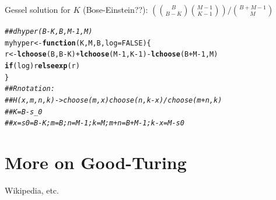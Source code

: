 \documentclass{article}\usepackage[]{graphicx}\usepackage[]{color}
\makeatletter
\newcommand{\hlnum}[1]{\textcolor[rgb]{0.686,0.059,0.569}{#1}}%
\newcommand{\hlcom}[1]{\textcolor[rgb]{0.678,0.584,0.686}{\textit{#1}}}%
\newcommand{\hlopt}[1]{\textcolor[rgb]{0,0,0}{#1}}%
\newcommand{\hlstd}[1]{\textcolor[rgb]{0.345,0.345,0.345}{#1}}%
\newcommand{\hlkwa}[1]{\textcolor[rgb]{0.161,0.373,0.58}{\textbf{#1}}}%
\newcommand{\hlkwb}[1]{\textcolor[rgb]{0.69,0.353,0.396}{#1}}%
\newcommand{\hlkwc}[1]{\textcolor[rgb]{0.333,0.667,0.333}{#1}}%
\newcommand{\hlkwd}[1]{\textcolor[rgb]{0.737,0.353,0.396}{\textbf{#1}}}%
\newenvironment{kframe}{%
 \def\at@end@of@kframe{}%
 \ifinner\ifhmode%
  \def\at@end@of@kframe{\end{minipage}}%
  \begin{minipage}{\columnwidth}%
 \fi\fi%
 \def\FrameCommand##1{\hskip\@totalleftmargin \hskip-\fboxsep
 \colorbox{shadecolor}{##1}\hskip-\fboxsep
     \hskip-\linewidth \hskip-\@totalleftmargin \hskip\columnwidth}%
 \MakeFramed {\advance\hsize-\width
   \@totalleftmargin\z@ \linewidth\hsize
   \@setminipage}}%
 {\par\unskip\endMakeFramed%
 \at@end@of@kframe}
\newenvironment{knitrout}{}{} %
\makeatother
\begin{document}
Gessel solution for $K$ (Bose-Einstein??):
$\left( \binom{B}{B-K} \binom{M-1}{K-1} \right) / \binom{B+M-1}{M}$
\begin{knitrout}
\color{fgcolor}\begin{kframe}
\begin{alltt}
\hlcom{## dhyper(B-K,B,M-1,M)}
\hlstd{myhyper} \hlkwb{<-} \hlkwa{function}\hlstd{(}\hlkwc{K}\hlstd{,}\hlkwc{M}\hlstd{,}\hlkwc{B}\hlstd{,}\hlkwc{log}\hlstd{=}\hlnum{FALSE}\hlstd{) \{}
    \hlstd{r} \hlkwb{<-} \hlkwd{lchoose}\hlstd{(B,B}\hlopt{-}\hlstd{K)}\hlopt{+}\hlkwd{lchoose}\hlstd{(M}\hlopt{-}\hlnum{1}\hlstd{,K}\hlopt{-}\hlnum{1}\hlstd{)}\hlopt{-}\hlkwd{lchoose}\hlstd{(B}\hlopt{+}\hlstd{M}\hlopt{-}\hlnum{1}\hlstd{,M)}
    \hlkwa{if} \hlstd{(log) r} \hlkwa{else} \hlkwd{exp}\hlstd{(r)}
\hlstd{\}}
\hlcom{## R notation:}
\hlcom{## H(x,m,n,k) -> choose(m,x) choose(n,k-x) / choose(m+n,k)}
\hlcom{## K=B-s_0}
\hlcom{## x=s0=B-K; m=B; n=M-1; k=M; m+n=B+M-1; k-x =M-s0}
\end{alltt}
\end{kframe}
\end{knitrout}

\section{More on Good-Turing}

Wikipedia, etc.


\end{document}
